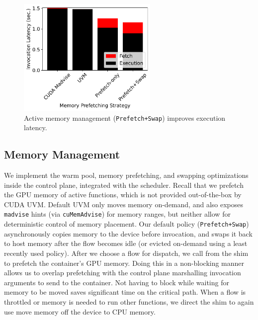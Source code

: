 \begin{figure}[H]
  \centering
  \includegraphics[width=0.6\textwidth]{./mqfq-final/graphs/mem-move/f16-i20-driver-mps-move.pdf}
  \caption{Active memory management (\texttt{Prefetch+Swap}) improves execution latency.}
  \label{fig:mem-prefetch}
\end{figure}

\subsection{Memory Management}

We implement the warm pool, memory prefetching, and swapping optimizations inside the control plane, integrated with the scheduler. 
Recall that we prefetch the GPU memory of active functions, which is not provided out-of-the-box by CUDA UVM. 
Default UVM only moves memory on-demand, and also exposes \texttt{madvise} hints (via \texttt{cuMemAdvise}) for memory ranges, but neither allow for deterministic control of memory placement.
Our default policy (\texttt{Prefetch+Swap}) asynchronously copies memory to the device before invocation, and swaps it back to host memory after the flow becomes idle (or evicted on-demand using a least recently used policy). 
After we choose a flow for dispatch, we call  from the shim to prefetch the container's GPU memory.
Doing this in a non-blocking manner allows us to overlap prefetching with the control plane marshalling invocation arguments to send to the container. 
Not having to block while waiting for memory to be moved saves significant time on the critical path.
When a flow is throttled or memory is needed to run other functions, we direct the shim to again use  move memory off the device to CPU memory. 


